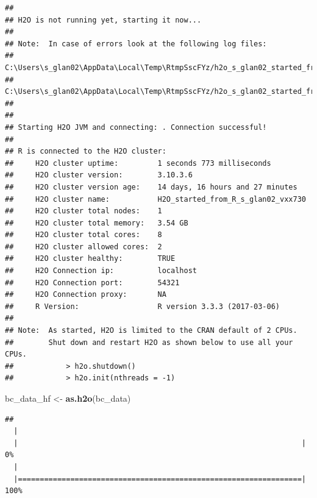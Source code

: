 \documentclass[]{article}
\newenvironment{Shaded}{\begin{snugshade}}{\end{snugshade}}
\newcommand{\KeywordTok}[1]{\textcolor[rgb]{0.13,0.29,0.53}{\textbf{{#1}}}}
\newcommand{\StringTok}[1]{\textcolor[rgb]{0.31,0.60,0.02}{{#1}}}
\newcommand{\NormalTok}[1]{{#1}}
\begin{document}
\begin{verbatim}
## 
## H2O is not running yet, starting it now...
## 
## Note:  In case of errors look at the following log files:
##     C:\Users\s_glan02\AppData\Local\Temp\RtmpSscFYz/h2o_s_glan02_started_from_r.out
##     C:\Users\s_glan02\AppData\Local\Temp\RtmpSscFYz/h2o_s_glan02_started_from_r.err
## 
## 
## Starting H2O JVM and connecting: . Connection successful!
## 
## R is connected to the H2O cluster: 
##     H2O cluster uptime:         1 seconds 773 milliseconds 
##     H2O cluster version:        3.10.3.6 
##     H2O cluster version age:    14 days, 16 hours and 27 minutes  
##     H2O cluster name:           H2O_started_from_R_s_glan02_vxx730 
##     H2O cluster total nodes:    1 
##     H2O cluster total memory:   3.54 GB 
##     H2O cluster total cores:    8 
##     H2O cluster allowed cores:  2 
##     H2O cluster healthy:        TRUE 
##     H2O Connection ip:          localhost 
##     H2O Connection port:        54321 
##     H2O Connection proxy:       NA 
##     R Version:                  R version 3.3.3 (2017-03-06) 
## 
## Note:  As started, H2O is limited to the CRAN default of 2 CPUs.
##        Shut down and restart H2O as shown below to use all your CPUs.
##            > h2o.shutdown()
##            > h2o.init(nthreads = -1)
\end{verbatim}

\begin{Shaded}
\begin{Highlighting}[]
\NormalTok{bc_data_hf <-}\StringTok{ }\KeywordTok{as.h2o}\NormalTok{(bc_data)}
\end{Highlighting}
\end{Shaded}

\begin{verbatim}
## 
  |                                                                       
  |                                                                 |   0%
  |                                                                       
  |=================================================================| 100%
\end{verbatim}
\end{document}
